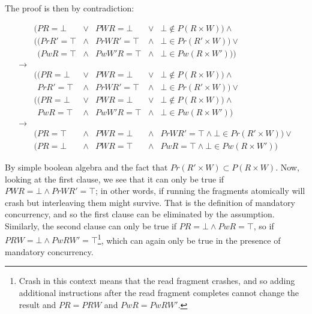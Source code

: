 The proof is then by contradiction: 

\begin{displaymath}
\begin{array}{llllll}
&  (PR = \bot    & \vee   & PWR = \bot   & \vee   & \bot \not\in P(R \times W)) \wedge \\
&  ((PrR' = \top & \wedge & PrWR' = \top & \wedge & \bot \in Pr(R' \times W )) \vee \\
&\hspace{5pt}(PwR  = \top & \wedge & PwW'R = \top & \wedge & \bot \in Pw(R  \times W'))) \\
{\rightarrow}\\
&  ((PR = \bot   & \vee   & PWR = \bot    & \vee   & \bot \not\in P(R \times W)) \wedge \\
&\hspace{5pt}PrR' = \top & \wedge & PrWR'  = \top & \wedge & \bot \in Pr(R' \times W )) \vee\\
&  ((PR = \bot   & \vee   & PWR = \bot    & \vee   & \bot \not\in P(R \times W)) \wedge \\
&\hspace{5pt}PwR  = \top & \wedge & PwW'R = \top  & \wedge & \bot \in Pw(R  \times W')) \\
{\rightarrow} \\
&  (PR = \top & \wedge & PWR = \bot & \wedge & PrWR' = \top \wedge \bot \in Pr(R' \times W )) \vee \\
&  (PR = \bot & \wedge & PWR = \top & \wedge & PwR = \top \wedge \bot \in Pw(R \times W')) 
\end{array}
\end{displaymath}

By simple boolean algebra and the fact that $Pr(R' \times W) \subset
P(R \times W)$.  Now, looking at the first clause, we see that it can
only be true if $PWR = \bot \wedge PrWR' = \top$; in other words, if
running the fragments atomically will crash but interleaving them
might survive.  That is the definition of mandatory concurrency, and
so the first clause can be eliminated by the assumption.  Similarly,
the second clause can only be true if $PR = \bot \wedge PwR = \top$,
so if $PRW = \bot \wedge PwRW' = \top$\footnote{Crash in this context
  means that the read fragment crashes, and so adding additional
  instructions after the read fragment completes cannot change the
  result and $PR = PRW$ and $PwR = PwRW'$.}, which can again only
be true in the presence of mandatory concurrency.

